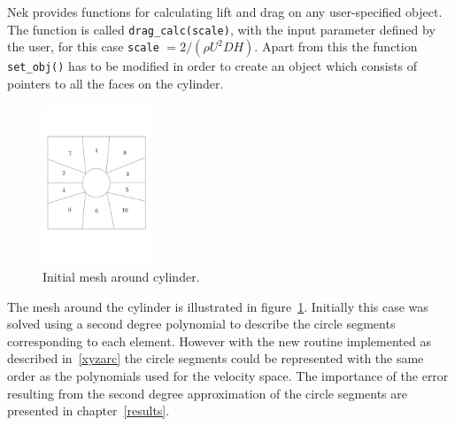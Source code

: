 Nek provides functions for calculating lift and drag on any user-specified object.
The function is called \verb|drag_calc(scale)|, with the input parameter 
defined by the user, for this case \verb|scale| $=2/(\rho U^2DH)$.  
Apart from this the function \verb|set_obj()| has to be modified in order to create an object 
which consists of pointers to all the faces on the cylinder.
%
\begin{figure}[h]
    \centering
    \includegraphics[width = 0.3\textwidth]{Figures/cyl_elem.pdf}
    \caption{Initial mesh around cylinder.}
    \label{fig:cyl_elem}
\end{figure}
%
The mesh around the cylinder is illustrated in figure~\ref{fig:cyl_elem}.
Initially this case was solved using a second degree polynomial to describe the circle segments
corresponding to each element. However with the new routine implemented as described 
in~\ref{xyzarc} the circle segments could be represented with the same order as 
the polynomials used for the velocity space. The importance of the error resulting 
from the second degree approximation of the circle segments are presented in chapter~\ref{results}.


